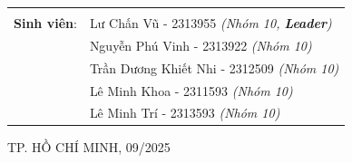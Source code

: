 \documentclass[a4paper]{article}
\begin{document}
\begin{titlepage}
\begin{table}[h]
\begin{tabular}{rl}
			                    &                                                        \\[10pt]
			\textbf{Sinh viên}: & Lư Chấn Vũ - 2313955 \emph{(Nhóm 10, \textbf{Leader})} \\
			                    & Nguyễn Phú Vinh - 2313922 \emph{(Nhóm 10)}             \\
			                    & Trần Dương Khiết Nhi - 2312509 \emph{(Nhóm 10)}        \\
			                    & Lê Minh Khoa - 2311593 \emph{(Nhóm 10)}                \\
			                    & Lê Minh Trí - 2313593 \emph{(Nhóm 10)}                 \\
		\end{tabular}
	\end{table}

	\begin{center}
		{\footnotesize TP. HỒ CHÍ MINH, 09/2025}
	\end{center}
\end{titlepage}

\pagebreak
\tableofcontents

\pagebreak

\printunsrtglossary[type={symbols}, title={Danh sách kí hiệu}]
\printunsrtglossary[type={abbreviations}, title={Danh sách từ viết tắt}]
\pagebreak
\listoffigures
\listoftables
\pagebreak
{}

% 

\end{document}
